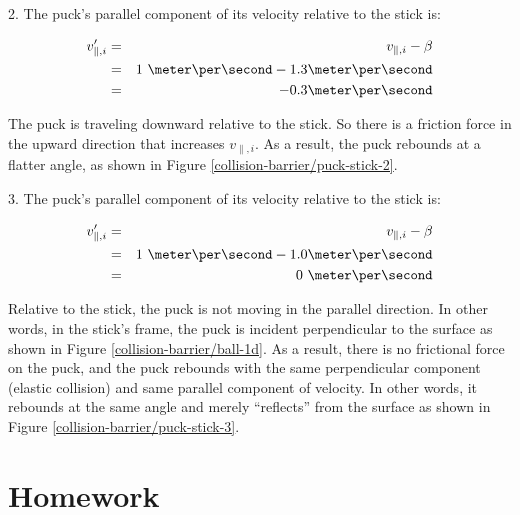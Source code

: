 
\vspace{1in}

2. The puck's parallel component of its velocity relative to the stick is:

\begin{eqnarray*}
	v^\prime_{\parallel,i} & = & v_{\parallel,i} - \beta \\
	& = & 1\ \meter\per\second - 1.3 \meter\per\second \\
	& = & -0.3 \meter\per\second
\end{eqnarray*}

The puck is traveling downward relative to the stick. So there is a friction force in the upward direction that increases $v_{\parallel,i}$. As a result, the puck rebounds at a flatter angle, as shown in Figure \ref{collision-barrier/puck-stick-2}.


3. The puck's parallel component of its velocity relative to the stick is:

\begin{eqnarray*}
	v^\prime_{\parallel,i} & = & v_{\parallel,i} - \beta \\
	& = & 1\ \meter\per\second - 1.0 \meter\per\second \\
	& = & 0\ \meter\per\second
\end{eqnarray*}

Relative to the stick, the puck is not moving in the parallel direction. In other words, in the stick's frame, the puck is incident perpendicular to the surface as shown in Figure \ref{collision-barrier/ball-1d}. As a result, there is no frictional force on the puck, and the puck rebounds with the same perpendicular component (elastic collision) and same parallel component of velocity. In other words, it rebounds at the same angle and merely ``reflects'' from the surface as shown in Figure \ref{collision-barrier/puck-stick-3}.






\newpage

\section{Homework}


